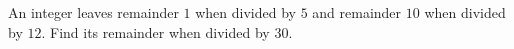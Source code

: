 An integer leaves remainder $1$ when divided by $5$ and remainder $10$ when divided by $12$. Find its remainder when divided by $30$.
